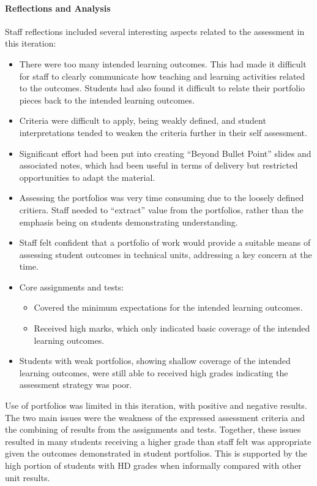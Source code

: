 \paragraph{Reflections and Analysis} %
\label{ssub:analysis}

Staff reflections included several interesting aspects related to the assessment in this iteration:
\begin{itemize}[noitemsep,nolistsep]
  \item There were too many intended learning outcomes. This had made it difficult for staff to clearly communicate how teaching and learning activities related to the outcomes. Students had also found it difficult to relate their portfolio pieces back to the intended learning outcomes.
  \item Criteria were difficult to apply, being weakly defined, and student interpretations tended to weaken the criteria further in their self assessment.
  \item Significant effort had been put into creating ``Beyond Bullet Point'' slides and associated notes, which had been useful in terms of delivery but restricted opportunities to adapt the material.
  \item Assessing the portfolios was very time consuming due to the loosely defined critiera. Staff needed to ``extract'' value from the portfolios, rather than the emphasis being on students demonstrating understanding.
  \item Staff felt confident that a portfolio of work would provide a suitable means of assessing student outcomes in technical units, addressing a key concern at the time.
  \item Core assignments and tests:
  \begin{itemize}[noitemsep,nolistsep]
    \item Covered the minimum expectations for the intended learning outcomes.
    \item Received high marks, which only indicated basic coverage of the intended learning outcomes. 
  \end{itemize}
  \item Students with weak portfolios, showing shallow coverage of the intended learning outcomes, were still able to received high grades indicating the assessment strategy was poor.
\end{itemize}

Use of portfolios was limited in this iteration, with positive and negative results. The two main issues were the weakness of the expressed assessment criteria and the combining of results from the assignments and tests. Together, these issues resulted in many students receiving a higher grade than staff felt was appropriate given the outcomes demonstrated in student portfolios. This is supported by the high portion of students with HD grades when informally compared with other unit results.

